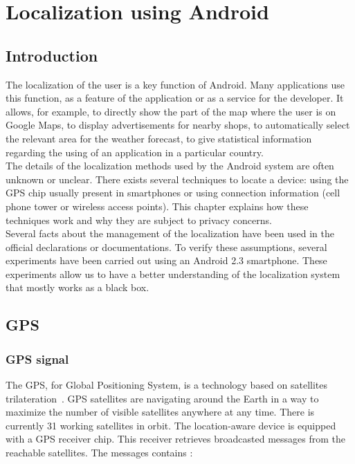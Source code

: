 \chapter{Localization using Android}
\label{chap:and-loc}

\section*{Introduction}
The localization of the user is a key function of Android.
Many applications use this function, as a feature of the application or as a service for the developer.
It allows, for example, to directly show the part of the map where the user is on Google Maps, to display advertisements for nearby shops, to automatically select the relevant area for the weather forecast, to give statistical information regarding the using of an application in a particular country.\\

The details of the localization methods used by the Android system are often unknown or unclear.
There exists several techniques to locate a device: using the GPS chip usually present in smartphones or using connection information (cell phone tower or wireless access points).
This chapter explains how these techniques work and why they are subject to privacy concerns.\\

Several facts about the management of the localization have been used in the official declarations or documentations.
To verify these assumptions, several experiments have been carried out using an Android 2.3 smartphone.
These experiments allow us to have a better understanding of the localization system that mostly works as a black box.


\section{GPS}
\label{sec:loc-gps}


\subsection{GPS signal}

The GPS, for Global Positioning System, is a technology based on satellites trilateration~\cite{pocketgpsworld}.
GPS satellites are navigating around the Earth in a way to maximize the number of visible satellites anywhere at any time.
There is currently 31 working satellites in orbit.
The location-aware device is equipped with a GPS receiver chip.
This receiver retrieves broadcasted messages from the reachable satellites.
The messages contains :

